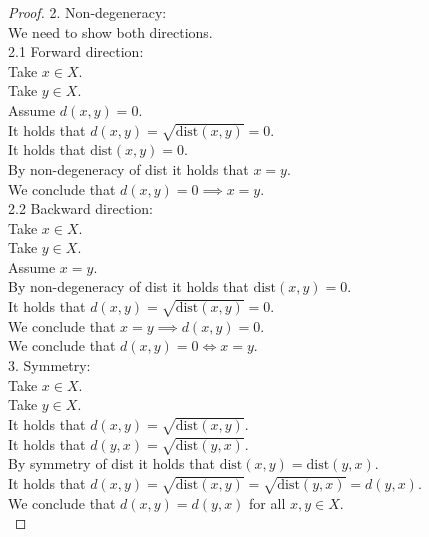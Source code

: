 \documentclass{article}
\theoremstyle{mytheoremstyle}
\theoremstyle{mytheoremstyle}
\theoremstyle{myproblemstyle}
\begin{document}
\begin{proof}
        2. Non-degeneracy: \\
        We need to show both directions. \\
        2.1 Forward direction: \\
        Take $x \in X$. \\
        Take $y \in X$. \\
        Assume $d(x,y) = 0$. \\
        It holds that $d(x,y) = \sqrt{\text{dist}(x,y)} = 0$. \\
        It holds that $\text{dist}(x,y) = 0$. \\
        By non-degeneracy of dist it holds that $x = y$. \\
        We conclude that $d(x,y) = 0 \implies x = y$. \\
        2.2 Backward direction: \\
        Take $x \in X$. \\
        Take $y \in X$. \\
        Assume $x = y$. \\
        By non-degeneracy of dist it holds that $\text{dist}(x,y) = 0$. \\
        It holds that $d(x,y) = \sqrt{\text{dist}(x,y)} = 0$. \\
        We conclude that $x = y \implies d(x,y) = 0$. \\
        We conclude that $d(x,y) = 0 \iff x = y$. \\

        3. Symmetry: \\
        Take $x \in X$. \\
        Take $y \in X$. \\
        It holds that $d(x,y) = \sqrt{\text{dist}(x,y)}$. \\
        It holds that $d(y,x) = \sqrt{\text{dist}(y,x)}$. \\
        By symmetry of dist it holds that $\text{dist}(x,y) = \text{dist}(y,x)$. \\
        It holds that $d(x,y) = \sqrt{\text{dist}(x,y)} = \sqrt{\text{dist}(y,x)} = d(y,x)$. \\
        We conclude that $d(x,y) = d(y,x)$ for all $x,y \in X$. \\


\end{proof}
\end{document}
